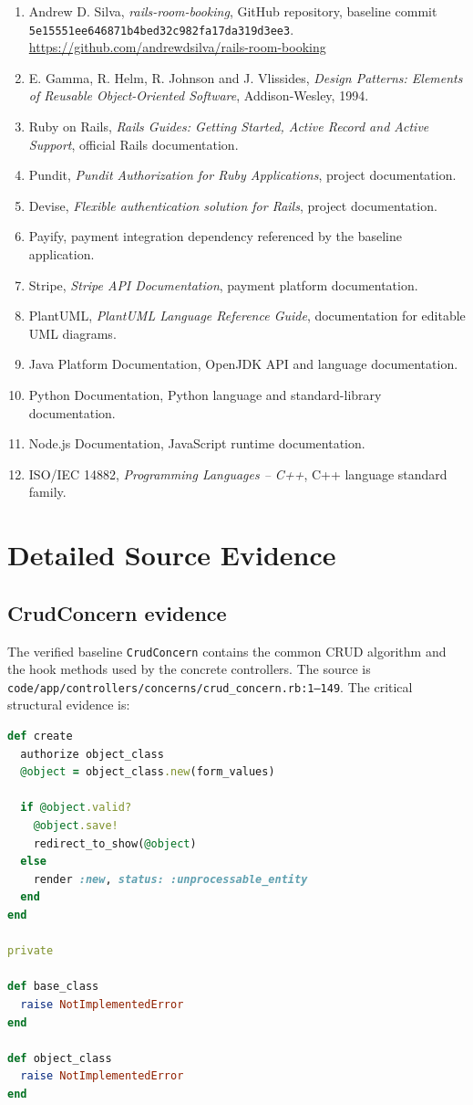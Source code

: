 \documentclass[10pt,a4paper]{article}
\newcommand{\code}[1]{\texttt{\small #1}}
\newcommand{\repo}{\url{https://github.com/andrewdsilva/rails-room-booking}}
\newcommand{\baseline}{\code{5e15551ee646871b4bed32c982fa17da319d3ee3}}
\begin{document}
\begin{enumerate}[leftmargin=*]
\item Andrew D. Silva, \emph{rails-room-booking}, GitHub repository, baseline commit \baseline. \repo
\item E. Gamma, R. Helm, R. Johnson and J. Vlissides, \emph{Design Patterns: Elements of Reusable Object-Oriented Software}, Addison-Wesley, 1994.
\item Ruby on Rails, \emph{Rails Guides: Getting Started, Active Record and Active Support}, official Rails documentation.
\item Pundit, \emph{Pundit Authorization for Ruby Applications}, project documentation.
\item Devise, \emph{Flexible authentication solution for Rails}, project documentation.
\item Payify, payment integration dependency referenced by the baseline application.
\item Stripe, \emph{Stripe API Documentation}, payment platform documentation.
\item PlantUML, \emph{PlantUML Language Reference Guide}, documentation for editable UML diagrams.
\item Java Platform Documentation, OpenJDK API and language documentation.
\item Python Documentation, Python language and standard-library documentation.
\item Node.js Documentation, JavaScript runtime documentation.
\item ISO/IEC 14882, \emph{Programming Languages -- C++}, C++ language standard family.
\end{enumerate}

\appendix
\section{Detailed Source Evidence}

\subsection{CrudConcern evidence}

The verified baseline \code{CrudConcern} contains the common CRUD algorithm and the hook methods used by the concrete controllers. The source is \code{code/app/controllers/concerns/crud\_concern.rb:1--149}. The critical structural evidence is:

\begin{lstlisting}[language=Ruby,caption={Core Template Method structure in CrudConcern}]
def create
  authorize object_class
  @object = object_class.new(form_values)

  if @object.valid?
    @object.save!
    redirect_to_show(@object)
  else
    render :new, status: :unprocessable_entity
  end
end

private

def base_class
  raise NotImplementedError
end

def object_class
  raise NotImplementedError
end
\end{lstlisting}
\end{document}
